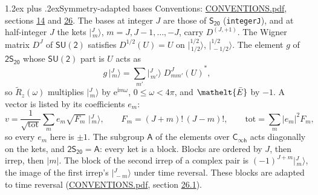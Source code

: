 \documentclass[10pt,a4paper]{article}
\makeatletter
\renewcommand\section{\@startsection{section}{1}{\z@}{-3ex plus -1ex minus -.2ex}%
  {1.2ex plus .2ex}{\normalfont\large\sffamily\bfseries\color{parttitle}}}
\numberwithin{equation}{section}
\newcommand{\eltfont}[1]{{\let\sigma\eltsigma\mathelt{#1}}}
\newcommand{\grp}[1]{\mathsf{#1}}
\newcommand{\elt}[1]{\eltfont{#1}}
\newcommand{\iunit}{\mathrm{i}}
\newcommand{\expe}{\mathrm{e}}
\newcommand{\irrJp}[2]{D^{(#1,#2)}}
\newcommand{\wignerD}[1]{D^{#1}}
\newcommand{\conj}[1]{{#1}^{*}}
\newcommand{\jm}[2]{\bigl\lvert{}^{#1}_{\,#2}\bigr\rangle}
\newcommand{\barred}[1]{\bar{#1}}
\newcommand{\lift}[1]{\tilde{#1}}
\makeatother
\begin{document}
\section{Symmetry-adapted bases}\label{s:bases}
Conventions: \href{../../CONVENTIONS.pdf}{CONVENTIONS.pdf}, sections \href{../../../rotation/CONVENTIONS.pdf\#conv.14}{14} and \href{../../CONVENTIONS.pdf\#conv.26}{26}.
\leavevmode\label{n:index.m}\label{n:vector.ket}The bases at integer $J$ are those of \href{../../../rotation/data/pdf/S20.pdf}{$\grp{S_{20}}$} (\texttt{integerJ}), and at half-integer $J$ the kets $\jm{J}{m}$, $m = J, J-1, \dots, -J$, carry $\irrJp{J}{+1}$. \label{n:matrix.wigner}The Wigner matrix $\wignerD{J}$ of $\grp{SU(2)}$ satisfies $\wignerD{1/2}(U) = U$ on $\jm{1/2}{1/2}$, $\jm{1/2}{-1/2}$. The element $g$ of $\grp{2S_{20}}$ whose $\grp{SU(2)}$ part is $U$ acts as
\begin{equation}\label{e:action}g\,\jm{J}{m} = \sum_{m'} \jm{J}{m'}\; \conj{\wignerD{J}_{m m'}(U)},\end{equation}
so $\lift{R}_{z}(\omega)$ multiplies $\jm{J}{m}$ by $\expe^{\iunit m\omega}$, $0 \le \omega < 4\pi$, and $\elt{\barred{E}}$ by $-1$. \label{n:index.ketcoefficient}\label{n:vector.basis.symmetry}\label{n:index.ketweight}\label{n:index.total}A vector is listed by its coefficients $e_m$:
\begin{equation}\label{e:ket}v = \frac{1}{\sqrt{\mathrm{tot}}}\sum_m e_m\sqrt{F_m}\;\jm{J}{m},\qquad F_m = (J+m)!\,(J-m)!,\qquad \mathrm{tot} = \sum_m |e_m|^2F_m,\end{equation}
so every $e_m$ here is $\pm 1$.
\leavevmode\label{n:group.A}The subgroup $\grp{A}$ of the elements over $\grp{C_{\infty h}}$ acts diagonally on the kets, and $\grp{2S_{20}} = \grp{A}$: every ket is a block. Blocks are ordered by $J$, then irrep, then $|m|$. The block of the second irrep of a complex pair is $(-1)^{J+m}\jm{J}{m}$, the image of the first irrep's $\jm{J}{-m}$ under time reversal. These blocks are adapted to time reversal (\href{../../CONVENTIONS.pdf}{CONVENTIONS.pdf}, section \href{../../CONVENTIONS.pdf\#conv.26.1}{26.1}).
\end{document}
